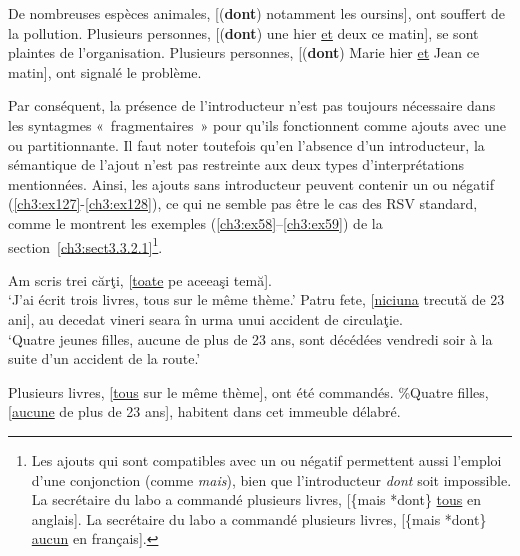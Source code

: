 \ea \label{ch3:ex126} 
\ea 
De nombreuses espèces animales, [(\textbf{dont}) notamment les oursins], ont souffert de la pollution. \label{ch3:ex126a} 
\ex
Plusieurs personnes, [(\textbf{dont}) une hier \uline{et} deux ce matin], se sont plaintes de l’organisation. \label{ch3:ex126b}
\ex 
Plusieurs personnes, [(\textbf{dont}) Marie hier \uline{et} Jean ce matin], ont signalé le problème. \label{ch3:ex126c}
\z 
\z 

Par conséquent, la présence de l’introducteur n’est pas toujours nécessaire dans les syntagmes «~fragmentaires~» pour qu’ils fonctionnent comme ajouts avec une  ou partitionnante. Il faut noter toutefois qu’en l’absence d’un introducteur, la sémantique de l’ajout n’est pas restreinte aux deux types d’interprétations mentionnées. Ainsi, les ajouts sans introducteur peuvent contenir un  ou négatif (\ref{ch3:ex127}-\ref{ch3:ex128}), ce qui ne semble pas être le cas des RSV standard, comme le montrent les exemples (\ref{ch3:ex58}--\ref{ch3:ex59}) de la section~\ref{ch3:sect3.3.2.1}\footnote{Les ajouts qui sont compatibles avec un  ou négatif permettent aussi l’emploi d’une conjonction (comme \textit{mais}), bien que l’introducteur \textit{dont} soit impossible.
\ea
\ea 
La secrétaire du labo a commandé plusieurs livres, [\{mais {\textbar} *dont\} \uline{tous} en anglais]. 
\ex 
La secrétaire du labo a commandé plusieurs livres, [\{mais {\textbar} *dont\} \uline{aucun} en français].
\z
\z
}.


\ea \label{ch3:ex127} 
\ea 
Am scris trei cărţi, [\uline{toate} pe aceeaşi temă]. \label{ch3:ex127a}\\
\glt ‘J’ai écrit trois livres, tous sur le même thème.’ 
\ex 
Patru fete, [\uline{niciuna} trecută de 23 ani], au decedat vineri seara în urma unui accident de circulaţie. \label{ch3:ex127b}\\
\glt ‘Quatre jeunes filles, aucune de plus de 23 ans, sont décédées vendredi soir à la suite d’un accident de la route.’
\z 
\z

\ea \label{ch3:ex128}
\ea 
Plusieurs livres, [\uline{tous} sur le même thème], ont été commandés. \label{ch3:ex128a} 
\ex
\%Quatre filles, [\uline{aucune} de plus de 23 ans], habitent dans cet immeuble délabré. \label{ch3:ex128b}
\z 
\z

